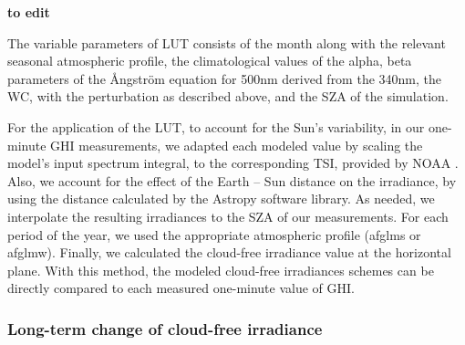 \documentclass[preprint, 5p,
authoryear]{elsarticle} %
\begin{document}
\textbf{to edit}

The variable parameters of LUT consists of the month along with the
relevant seasonal atmospheric profile, the climatological values of the
alpha, beta parameters of the Ångström equation for 500nm derived from
the 340nm, the WC, with the perturbation as described above, and the SZA
of the simulation.

For the application of the LUT, to account for the Sun's variability, in
our one-minute GHI measurements, we adapted each modeled value by
scaling the model's input spectrum integral, to the corresponding TSI,
provided by NOAA \citep{Coddington2005}. Also, we account for the effect
of the Earth -- Sun distance on the irradiance, by using the distance
calculated by the Astropy \citep{AstropyCollaboration2022} software
library. As needed, we interpolate the resulting irradiances to the SZA
of our measurements. For each period of the year, we used the
appropriate atmospheric profile (afglms or afglmw). Finally, we
calculated the cloud-free irradiance value at the horizontal plane. With
this method, the modeled cloud-free irradiances schemes can be directly
compared to each measured one-minute value of GHI.

\hypertarget{long-term-change-of-cloud-free-irradiance}{%
\subsubsection{Long-term change of cloud-free
irradiance}\label{long-term-change-of-cloud-free-irradiance}}
\end{document}
